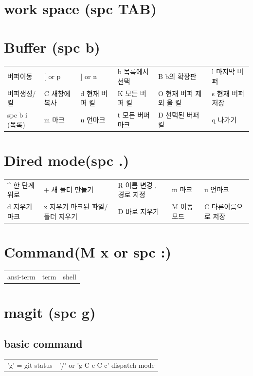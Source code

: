 \documentclass[11pt]{article}
\begin{document}
\section{work space (spc TAB)}
\label{sec:orga16cc33}
\section{Buffer (spc b)}
\label{sec:org06a1c80}
\begin{center}
\begin{tabular}{llllll}
버퍼이동 & [ or p & ] or n & b 목록에서 선택 & B b의 확장판 & l 마지막 버퍼\\
버퍼생성/킬 & C 새창에 복사 & d 현재 버퍼 킬 & K 모든 버퍼 킬 & O 현재 버퍼 제외 올 킬 & s 현재 버퍼 저장\\
spc b i (목록) & m 마크 & u 언마크 & t 모든 버퍼 마크 & D  선택된 버퍼 킬 & q 나가기\\
\end{tabular}
\end{center}
\section{Dired mode(spc .)}
\label{sec:org9d244e7}
\begin{center}
\begin{tabular}{lllll}
\^{} 한 단계 위로 & + 새 폴더 만들기 & R 이름 변경 , 경로 지정 & m 마크 & u 언마크\\
d 지우기 마크 & x 지우기 마크된 파일/폴더 지우기 & D 바로 지우기 & M 이동 모드 & C 다른이름으로 저장\\
\end{tabular}
\end{center}
\section{Command(M x or spc :)}
\label{sec:org518105c}
\begin{center}
\begin{tabular}{lll}
ansi-term & term & shell\\
\end{tabular}
\end{center}
\section{magit (spc g)}
\label{sec:org770b9d8}
\subsection{basic command}
\label{sec:orgde63cc6}
\begin{center}
\begin{tabular}{ll}
'g' = git status & '/' or 'g C-c C-c'  dispatch mode\\
\end{tabular}
\end{center}
\end{document}
